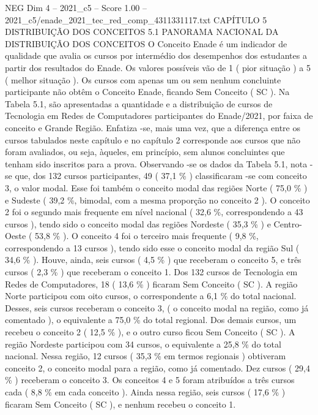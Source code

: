 \begin{textsample}{NEG Dim 4 – 2021\_c5 – Score 1.00 – 2021\_c5/enade\_2021\_tec\_red\_comp\_4311331117.txt}  \label{ex:f4_neg_148}
CAPÍTULO 5 DISTRIBUIÇÃO DOS CONCEITOS 5.1 PANORAMA NACIONAL DA DISTRIBUIÇÃO DOS CONCEITOS O Conceito Enade é um indicador de qualidade que avalia os cursos por intermédio dos desempenhos dos estudantes a partir dos resultados do Enade.
Os valores possíveis vão de 1 ( pior situação ) a 5 ( melhor situação ).
Os cursos com apenas um ou sem nenhum concluinte participante não obtêm o Conceito Enade, ficando Sem Conceito ( SC ).
Na Tabela 5.1, são apresentadas a quantidade e a distribuição de cursos de Tecnologia em Redes de Computadores participantes do Enade/2021, por faixa de conceito e Grande Região.
Enfatiza -se, mais uma vez, que a diferença entre os cursos tabulados neste capítulo e no capítulo 2 corresponde aos cursos que não foram avaliados, ou seja, àqueles, em princípio, sem alunos concluintes que tenham sido inscritos para a prova.
Observando -se os dados da Tabela 5.1, nota -se que, dos 132 cursos participantes, 49 ( 37,1 \% ) classificaram -se com conceito 3, o valor modal.
Esse foi também o conceito modal das regiões Norte ( 75,0 \% ) e Sudeste ( 39,2 \%, bimodal, com a mesma proporção no conceito 2 ).
O conceito 2 foi o segundo mais frequente em nível nacional ( 32,6 \%, correspondendo a 43 cursos ), tendo sido o conceito modal das regiões Nordeste ( 35,3 \% ) e Centro-Oeste ( 53,8 \% ).
O conceito 4 foi o terceiro mais frequente ( 9,8 \%, correspondendo a 13 cursos ), tendo sido esse o conceito modal da região Sul ( 34,6 \% ).
Houve, ainda, seis cursos ( 4,5 \% ) que receberam o conceito 5, e três cursos ( 2,3 \% ) que receberam o conceito 1.
Dos 132 cursos de Tecnologia em Redes de Computadores, 18 ( 13,6 \% ) ficaram Sem Conceito ( SC ).
A região Norte participou com oito cursos, o correspondente a 6,1 \% do total nacional.
Desses, seis cursos receberam o conceito 3, ( o conceito modal na região, como já comentado ), o equivalente a 75,0 \% do total regional.
Dos demais cursos, um recebeu o conceito 2 ( 12,5 \% ), e o outro curso ficou Sem Conceito ( SC ).
A região Nordeste participou com 34 cursos, o equivalente a 25,8 \% do total nacional.
Nessa região, 12 cursos ( 35,3 \% em termos regionais ) obtiveram conceito 2, o conceito modal para a região, como já comentado.
Dez cursos ( 29,4 \% ) receberam o conceito 3.
Os conceitos 4 e 5 foram atribuídos a três cursos cada ( 8,8 \% em cada conceito ).
Ainda nessa região, seis cursos ( 17,6 \% ) ficaram Sem Conceito ( SC ), e nenhum recebeu o conceito 1.

\end{textsample}
